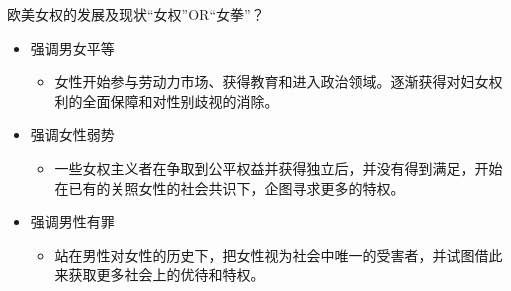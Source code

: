 \documentclass{beamer}
\begin{document}
	\begin{frame}{欧美女权的发展及现状}{“女权”OR“女拳”？}
		\begin{itemize}
			\item 强调男女平等
			\begin{itemize}
				\item 女性开始参与劳动力市场、获得教育和进入政治领域。逐渐获得对妇女权利的全面保障和对性别歧视的消除。
			\end{itemize}
			\item 强调女性弱势
			\begin{itemize}
				\item 一些女权主义者在争取到公平权益并获得独立后，并没有得到满足，开始在已有的关照女性的社会共识下，企图寻求更多的特权。
			\end{itemize}
			\item 强调男性有罪
			\begin{itemize}
				\item 站在男性对女性的历史下，把女性视为社会中唯一的受害者，并试图借此来获取更多社会上的优待和特权。
			\end{itemize}

		\end{itemize}
	\end{frame}
\end{document}
